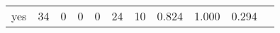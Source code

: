 \begin{longtable}{lp{1.10cm}p{1.10cm}p{1.10cm}p{1.10cm}p{1.10cm}p{1.10cm}p{1.10cm}p{1.10cm}p{1.10cm}p{1.10cm}}
yes       &                     34 &                                  0 &                                 0 &                                0 &                                24 &                              10 &                          0.824 &                                 1.000 &                               0.294 \\
\end{longtable}
